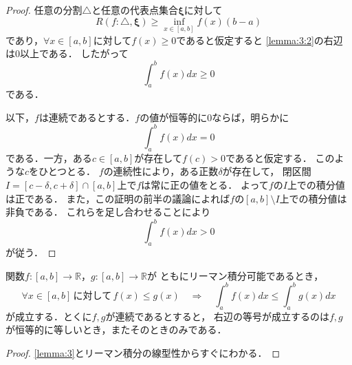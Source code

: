 \documentclass[./index]{subfiles}
\begin{document}
\begin{proof}
    任意の分割$\triangle$と任意の代表点集合$\mathbf{\xi}$に対して
    \begin{equation}
        \label{lemma:3:2}
        R(f: \triangle, \mathbf{\xi}) \ge \inf_{x \in [a, b]} f(x) (b - a)
    \end{equation}
    であり，$\forall x \in [a, b]$に対して$f(x) \ge 0$であると仮定すると
    \cref{lemma:3:2}の右辺は$0$以上である．
    したがって
    \begin{equation}
        \int_a^b f(x) dx \ge 0
    \end{equation}
    である．

    以下，$f$は連続であるとする．$f$の値が恒等的に$0$ならば，明らかに
    \begin{equation}
        \int_a^b f(x) dx = 0
    \end{equation}
    である．一方，ある$c \in [a, b]$が存在して$f(c) > 0$であると仮定する．
    このような$c$をひとつとる．
    $f$の連続性により，ある正数$\delta$が存在して，
    閉区間$I = [c-\delta, c+\delta] \cap [a, b]$上で$f$は常に正の値をとる．
    よって$f$の$I$上での積分値は正である．
    また，この証明の前半の議論によれば$f$の$[a, b] \setminus I$上での積分値は非負である．
    これらを足し合わせることにより
    \begin{equation}
        \int_a^b f(x) dx > 0
    \end{equation}
    が従う．
\end{proof}

\begin{screen}
    \begin{proposition}
        \label{proposition:inequality}
        関数$f: [a, b] \rightarrow \mathbb{R}$，$g: [a, b] \rightarrow \mathbb{R}$が
        ともにリーマン積分可能であるとき，
        \begin{equation}
            \forall x \in [a, b] \,\mbox{に対して}\, f(x) \le g(x)
            \quad \Longrightarrow \quad
            \int_a^b f(x) dx \le \int_a^b g(x) dx
        \end{equation}
        が成立する．とくに$f, g$が連続であるとすると，
        右辺の等号が成立するのは$f, g$が恒等的に等しいとき，またそのときのみである．
    \end{proposition}
\end{screen}

\begin{proof}
    \cref{lemma:3}とリーマン積分の線型性からすぐにわかる．
\end{proof}
\end{document}
